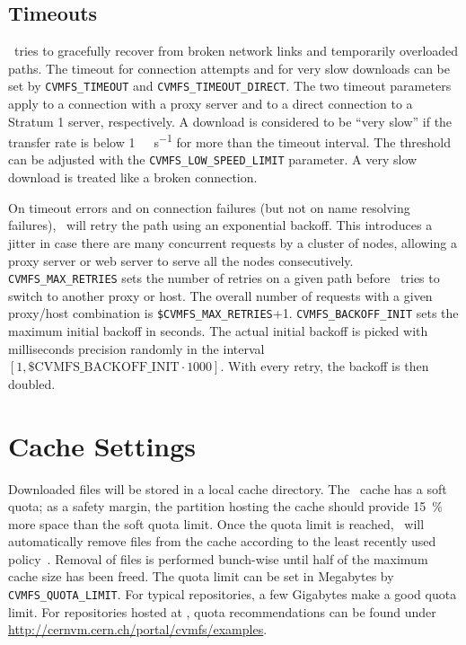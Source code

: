 \subsection{Timeouts}
\cvmfs\ tries to gracefully recover from broken network links and temporarily overloaded paths.
The timeout for connection attempts and for very slow downloads can be set by \texttt{CVMFS\_TIMEOUT} and \texttt{CVMFS\_TIMEOUT\_DIRECT}.
The two timeout parameters apply to a connection with a proxy server and to a direct connection to a Stratum 1 server, respectively.
A download is considered to be ``very slow'' if the transfer rate is below \SI{1}{\kilo\byte\per\second} for more than the timeout interval.
The threshold can be adjusted with the \texttt{CVMFS\_LOW\_SPEED\_LIMIT} parameter.
A very slow download is treated like a broken connection.

On timeout errors and on connection failures (but not on name resolving failures), \cvmfs\ will retry the path using an exponential backoff.
This introduces a jitter in case there are many concurrent requests by a cluster of nodes, allowing a proxy server or web server to serve all the nodes consecutively.
\texttt{CVMFS\_MAX\_RETRIES} sets the number of retries on a given path before \cvmfs\ tries to switch to another proxy or host. 
The overall number of requests with a given proxy/host combination is \texttt{\$CVMFS\_MAX\_RETRIES}+1.
\texttt{CVMFS\_BACKOFF\_INIT} sets the maximum initial backoff in seconds.  
The actual initial backoff is picked with milliseconds precision randomly in the interval $[1, \text{\$CVMFS\_BACKOFF\_INIT}\cdot 1000]$.
With every retry, the backoff is then doubled.

\section{Cache Settings}
\label{sct:config:cache}
Downloaded files will be stored in a local cache directory.
The \cvmfs\ cache has a soft quota; as a safety margin, the partition hosting the cache should provide \SI{15}{\percent} more space than the soft quota limit.
Once the quota limit is reached, \cvmfs\ will automatically remove files from the cache according to the least recently used policy~\cite{lru06}.
Removal of files is performed bunch-wise until half of the maximum cache size has been freed.
The quota limit can be set in Megabytes by \texttt{CVMFS\_QUOTA\_LIMIT}.
For typical repositories, a few Gigabytes make a good quota limit.
For repositories hosted at \cern, quota recommendations can be found under \url{http://cernvm.cern.ch/portal/cvmfs/examples}.

